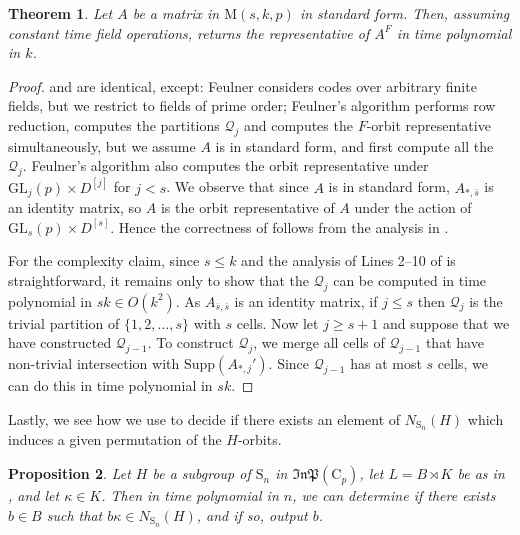\documentclass[11pt,a4paper]{article}
\newtheorem{theorem}{Theorem}[section]
\newtheorem{proposition}[theorem]{Proposition}
\theoremstyle{definition}
\theoremstyle{remark}
\newcommand{\InP}{\mathfrak{InP}}
\newcommand{\Sy}{\mathrm{S}}
\newcommand{\Cy}{\mathrm{C}}
\newcommand{\Supp}{\mathrm{Supp}}
\begin{document}
\begin{theorem} \label{semicanon is poly} \label{semicanon partition in poly time}
Let $A$ be a matrix in $\mathrm{M}(s,k,p)$ in standard form. 
Then, assuming constant time field operations,  returns the representative of $A^F$ in time polynomial in $k$. 
\end{theorem}

\begin{proof}
 and \cite[Algorithm~1]{feulner} are identical, except: 
Feulner considers codes over arbitrary finite fields, but we restrict to fields of prime order; 
Feulner's algorithm performs row reduction, computes the partitions $\mathcal{Q}_{j}$ and computes the $F$-orbit representative simultaneously, but we assume $A$ is in standard form, and first compute all the $\mathcal{Q}_{j}$. 
Feulner's algorithm also computes the orbit representative under $\mathrm{GL}_j(p) \times D^{[j]}$ for $j < s$. We observe that since $A$ is in standard form, $A_{*, \overline{s}}$ is an identity matrix, so $A$ is the orbit representative of $A$ under the action of $\mathrm{GL}_s(p) \times D^{[s]}$. 
Hence the correctness of  follows from the analysis in \cite{feulner}. 

For the complexity claim, since $s \leq k$ and the analysis of Lines 2--10 of  is straightforward, it remains only to show that the $\mathcal{Q}_j$ can be computed in time polynomial in $sk \in O(k^2)$. 
As $A_{\overline{s},\overline{s}}$ is an identity matrix, if $j \leq s$ then $\mathcal{Q}_j$ is the trivial partition of $\{ 1,2, \ldots, s\}$ with 
$s$ cells. 
Now let $j \geq s+1$ and suppose that we have constructed $\mathcal{Q}_{j-1}$. To construct $\mathcal{Q}_j$, we merge all cells of $\mathcal{Q}_{j-1}$ that have non-trivial intersection with $\Supp(A_{*,j}')$. 
Since $\mathcal{Q}_{j-1}$ has at most $s$ cells, we can do this in time polynomial in $sk$.
\end{proof}


Lastly, we see how we use  to decide if there exists an element of $N_{\Sy_n}(H)$ which induces a given permutation of the $H$-orbits. 

\begin{proposition} \label{suffices to search in Sn}
Let $H$ be a subgroup of $\Sy_n$ in $\InP(\Cy_p)$, let $L= B \rtimes K$ be as in ,  and let $\kappa \in K$. 
Then in time polynomial in $n$, we can determine if there exists $b \in B$ such that $b \kappa \in N_{\Sy_n}(H)$, and if so, output $b$. 
\end{proposition}
\end{document}
